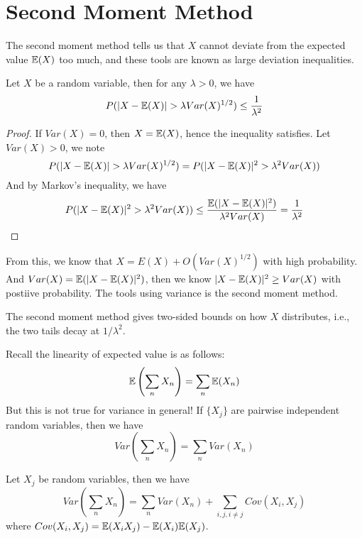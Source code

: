 \section{Second Moment Method}
The second moment method tells us that $X$ cannot deviate from the expected value $\mathbb{E}(X)$ too much, and these tools are known as large deviation inequalities.
\begin{thm}
    Let $X$ be a random variable, then for any $\lambda>0$, we have 
    \begin{equation*}
        P(|X-\E(X)|>\lambda Var(X)^{1/2})\leq\frac{1}{\lambda^2}
    \end{equation*}
\end{thm}
\begin{proof}
    If $Var(X)=0$, then $X=\mathbb{E}(X)$, hence the inequality satisfies. Let $Var(X)>0$, we note 
    \begin{equation*}
        P(|X-\E(X)|>\lambda Var(X)^{1/2})=P(|X-\E(X)|^2>\lambda^2 Var(X))
    \end{equation*}
    And by Markov's inequality, we have 
    \begin{equation*}
        P(|X-\mathbb{E}(X)|^2>\lambda^2 Var(X))\leq\frac{\mathbb{E}(|X-\mathbb{E}(X)|^2)}{\lambda^2Var(X)}=\frac{1}{\lambda^2}
    \end{equation*}
\end{proof}
From this, we know that $X=E(X)+O(Var(X)^{1/2})$ with high probability. And $Var(X)=\mathbb{E}(|X-\mathbb{E}(X)|^2)$, then we know $|X-\mathbb{E}(X)|^2\geq Var(X)$ with postiive probability. The tools using variance is the second moment method.
\begin{warn}
    The second moment method gives two-sided bounds on how $X$ distributes, i.e., the two tails decay at $1/\lambda^2$.
\end{warn}
Recall the linearity of expected value is as follows:
\begin{equation*}
    \mathbb{E}\left(\sum_n X_n\right)=\sum_n \mathbb{E}(X_n)
\end{equation*}
But this is not true for variance in general! If $\{X_j\}$ are pairwise independent random variables, then we have 
\begin{equation*}
    Var\left(\sum_n X_n\right)=\sum_nVar(X_n)
\end{equation*}
\begin{lem}
    Let $X_j$ be random variables, then we have 
    \begin{equation*}
        Var\left(\sum_n X_n\right)=\sum_n Var(X_n)+\sum_{i,j, i\neq j}Cov(X_i, X_j)
    \end{equation*}
    where $Cov(X_i, X_j)=\mathbb{E}(X_iX_j)-\mathbb{E}(X_i)\mathbb{E}(X_j)$.
\end{lem}

